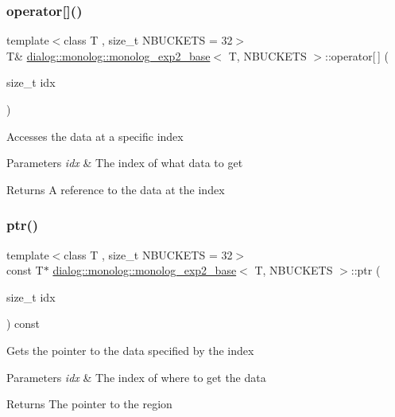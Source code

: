 \subsubsection{\texorpdfstring{operator[]()}{operator[]()}}
{\footnotesize\ttfamily template$<$class T , size\+\_\+t N\+B\+U\+C\+K\+E\+TS = 32$>$ \\
T\& \hyperlink{classdialog_1_1monolog_1_1monolog__exp2__base}{dialog\+::monolog\+::monolog\+\_\+exp2\+\_\+base}$<$ T, N\+B\+U\+C\+K\+E\+TS $>$\+::operator\mbox{[}$\,$\mbox{]} (\begin{DoxyParamCaption}\item[{size\+\_\+t}]{idx }\end{DoxyParamCaption})\hspace{0.3cm}{\ttfamily [inline]}}

Accesses the data at a specific index 
\begin{DoxyParams}{Parameters}
{\em idx} & The index of what data to get \\
\hline
\end{DoxyParams}
\begin{DoxyReturn}{Returns}
A reference to the data at the index 
\end{DoxyReturn}
\mbox{\label{classdialog_1_1monolog_1_1monolog__exp2__base_a76b101e66b927da18d6a723656a6a173}} 
\subsubsection{\texorpdfstring{ptr()}{ptr()}}
{\footnotesize\ttfamily template$<$class T , size\+\_\+t N\+B\+U\+C\+K\+E\+TS = 32$>$ \\
const T$\ast$ \hyperlink{classdialog_1_1monolog_1_1monolog__exp2__base}{dialog\+::monolog\+::monolog\+\_\+exp2\+\_\+base}$<$ T, N\+B\+U\+C\+K\+E\+TS $>$\+::ptr (\begin{DoxyParamCaption}\item[{size\+\_\+t}]{idx }\end{DoxyParamCaption}) const\hspace{0.3cm}{\ttfamily [inline]}}

Gets the pointer to the data specified by the index 
\begin{DoxyParams}{Parameters}
{\em idx} & The index of where to get the data \\
\hline
\end{DoxyParams}
\begin{DoxyReturn}{Returns}
The pointer to the region 
\end{DoxyReturn}
\mbox{\label{classdialog_1_1monolog_1_1monolog__exp2__base_a86d27f015adcd1320b4e1f811e1c1ceb}} 
